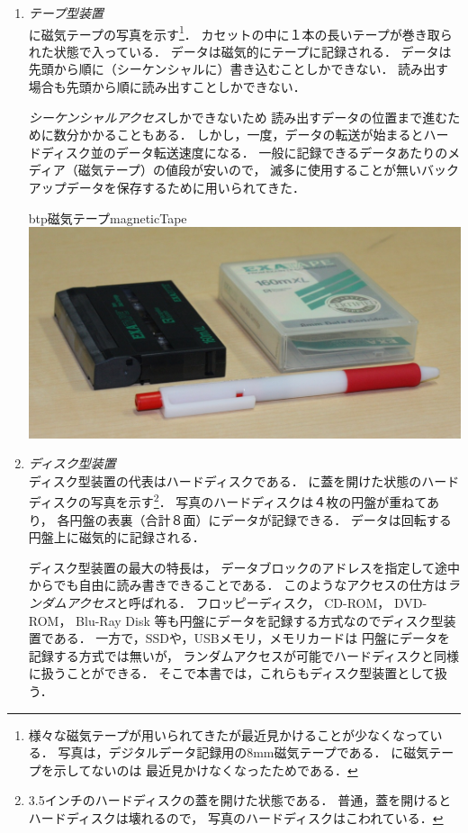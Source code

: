 \begin{enumerate}
\item \emph{テープ型装置}\\
  に磁気テープの写真を示す\footnote{
    様々な磁気テープが用いられてきたが最近見かけることが少なくなっている．
    写真は，デジタルデータ記録用の8mm磁気テープである．
    に磁気テープを示してないのは
    最近見かけなくなったためである．
  }．
  カセットの中に１本の長いテープが巻き取られた状態で入っている．
  データは磁気的にテープに記録される．
  データは先頭から順に（シーケンシャルに）書き込むことしかできない．
  読み出す場合も先頭から順に読み出すことしかできない．

  \emph{シーケンシャルアクセス}しかできないため
  読み出すデータの位置まで進むために数分かかることもある．
  しかし，一度，データの転送が始まるとハードディスク並のデータ転送速度になる．
  一般に記録できるデータあたりのメディア（磁気テープ）の値段が安いので，
  滅多に使用することが無いバックアップデータを保存するために用いられてきた．

  \begin{myfig}{btp}{磁気テープ}{magneticTape}
    \includegraphics[scale=0.3]{Fig/magneticTape.jpg}
  \end{myfig}

\item \emph{ディスク型装置} \\
  ディスク型装置の代表はハードディスクである．
  に蓋を開けた状態のハードディスクの写真を示す\footnote{
    3.5インチのハードディスクの蓋を開けた状態である．
    普通，蓋を開けるとハードディスクは壊れるので，
    写真のハードディスクはこわれている．}．
  写真のハードディスクは４枚の円盤が重ねてあり，
  各円盤の表裏（合計８面）にデータが記録できる．
  データは回転する円盤上に磁気的に記録される．

  ディスク型装置の最大の特長は，
  データブロックのアドレスを指定して途中からでも自由に読み書きできることである．
  このようなアクセスの仕方は\emph{ランダムアクセス}と呼ばれる．
  フロッピーディスク，
  CD-ROM，
  DVD-ROM，
  Blu-Ray Disk 等も円盤にデータを記録する方式なのでディスク型装置である．
  一方で，SSDや，USBメモリ，メモリカードは
  円盤にデータを記録する方式では無いが，
  ランダムアクセスが可能でハードディスクと同様に扱うことができる．
  そこで本書では，これらもディスク型装置として扱う．


\end{enumerate}
